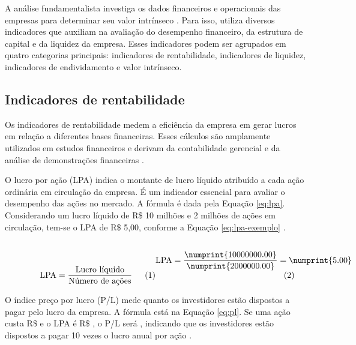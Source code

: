 \documentclass[recuosum=1.5cm]{iftex2024}
\begin{document}
A análise fundamentalista investiga os dados financeiros e operacionais das empresas para determinar seu valor intrínseco \cite{mathew:2024:overview}. Para isso, utiliza diversos indicadores que auxiliam na avaliação do desempenho financeiro, da estrutura de capital e da liquidez da empresa. Esses indicadores podem ser agrupados em quatro categorias principais: indicadores de rentabilidade, indicadores de liquidez, indicadores de endividamento e valor intrínseco.

\subsection{Indicadores de rentabilidade}

Os indicadores de rentabilidade medem a eficiência da empresa em gerar lucros em relação a diferentes bases financeiras. Esses cálculos são amplamente utilizados em estudos financeiros e derivam da contabilidade gerencial e da análise de demonstrações financeiras \cite{kothari:2001:capital}.

O lucro por ação (LPA) indica o montante de lucro líquido atribuído a cada ação ordinária em circulação da empresa. É um indicador essencial para avaliar o desempenho das ações no mercado.  
A fórmula é dada pela Equação \eqref{eq:lpa}. Considerando um lucro líquido de R\$ 10 milhões e 2 milhões de ações em circulação, tem-se o LPA de R\$ 5,00, conforme a Equação \eqref{eq:lpa-exemplo} \cite{omane:2019:time}.

\bigskip
\begin{subequations} \noindent
\begin{minipage}[b]{0.48\linewidth}
  \begin{equation} \label{eq:lpa}
    \text{LPA} = \frac{\text{Lucro líquido}}{\text{Número de ações}}
  \end{equation}
\end{minipage}
\hfill
\begin{minipage}[b]{0.48\linewidth}
  \begin{equation} \label{eq:lpa-exemplo}
    \text{LPA} = \frac{\numprint{10000000.00}}{\numprint{2000000.00}} = \numprint{5.00}
  \end{equation}
\end{minipage}
\end{subequations}
\bigskip

O índice preço por lucro (P/L) mede quanto os investidores estão dispostos a pagar pelo lucro da empresa.  
A fórmula está na Equação \eqref{eq:pl}. Se uma ação custa R\$  e o LPA é R\$ , o P/L será , indicando que os investidores estão dispostos a pagar 10 vezes o lucro anual por ação \cite{sahu:2023:overview}.
\end{document}
